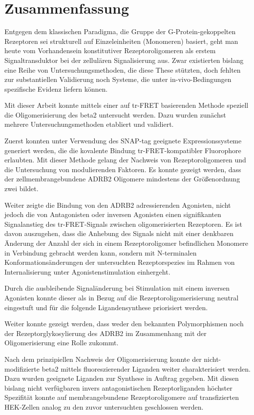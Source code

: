 \chapter{Zusammenfassung}\label{chapter:zusammenfassung}

Entgegen dem klassischen Paradigma, die Gruppe der G-Protein-gekoppelten Rezeptoren sei strukturell auf Einzeleinheiten (Monomeren) basiert, geht man heute vom Vorhandensein konstitutiver Rezeptoroligomeren als erstem Signaltransduktor bei der zellulären Signalisierung aus. Zwar existierten bislang  eine Reihe von Untersuchungsmethoden, die diese These stützten, doch fehlten zur substantiellen Validierung noch Systeme, die unter in-vivo-Bedingungen spezifische Evidenz liefern können.

Mit dieser Arbeit konnte mittels einer auf tr-FRET basierenden Methode speziell die Oligomerisierung des \gls{beta2} untersucht werden. Dazu wurden zunächst mehrere Untersuchungsmethoden etabliert und validiert. 

Zuerst konnten unter Verwendung des SNAP-tag geeignete Expressionssysteme generiert werden, die die kovalente Bindung tr-FRET-kompatibler Fluorophore erlaubten. Mit dieser Methode gelang der Nachweis von Rezeptoroligomeren und die Untersuchung von modulierenden Faktoren. Es konnte gezeigt werden, dass der zellmembrangebundene ADRB2 Oligomere mindestens der Größenordnung zwei bildet.

 Weiter zeigte die Bindung von den ADRB2 adressierenden Agonisten, nicht jedoch die von Antagonisten oder inversen Agonisten einen signifikanten Signalanstieg des tr-FRET-Signals zwischen oligomerisierten Rezeptoren. Es ist davon auszugehen, dass die Anhebung des Signals nicht mit einer denkbaren Änderung der Anzahl der sich in einem Rezeptoroligomer befindlichen Monomere in Verbindung gebracht werden kann, sondern mit N-terminalen Konformationsänderungen der untersuchten Rezeptorspezies im Rahmen von Internalisierung unter Agonistenstimulation einhergeht. 
 
 Durch die ausbleibende Signaländerung bei Stimulation mit einem inversen Agonisten konnte dieser als in Bezug auf die Rezeptoroligomerisierung neutral eingestuft und für die folgende Ligandensynthese priorisiert werden. 
 
 Weiter konnte gezeigt werden, dass weder den bekannten Polymorphismen noch der Rezeptorglykosylierung des ADRB2 im Zusammenhang mit der Oligomerisierung eine Rolle zukommt.

 Nach dem prinzipiellen Nachweis der Oligomerisierung konnte der nicht-modifizierte \gls{beta2} mittels fluoreszierender Liganden weiter charakterisiert werden. Dazu wurden geeignete Liganden zur Synthese in Auftrag gegeben. Mit diesen bislang nicht verfügbaren invers antagonistischen Rezeptorliganden höchster Spezifität konnte auf membrangebundene Rezeptoroligomere auf transfizierten HEK-Zellen analog zu den zuvor untersuchten geschlossen werden. 
 
